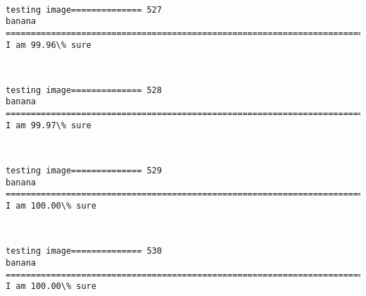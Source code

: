 \documentclass[11pt]{article}
\begin{document}
    \begin{center}
    \end{center}
    { \hspace*{\fill} \\}
    
    \begin{Verbatim}[commandchars=\\\{\}]
testing image============== 527
banana
============================================================================
I am 99.96\% sure

    \end{Verbatim}

    \begin{center}
    \end{center}
    { \hspace*{\fill} \\}
    
    \begin{Verbatim}[commandchars=\\\{\}]
testing image============== 528
banana
============================================================================
I am 99.97\% sure

    \end{Verbatim}

    \begin{center}
    \end{center}
    { \hspace*{\fill} \\}
    
    \begin{Verbatim}[commandchars=\\\{\}]
testing image============== 529
banana
============================================================================
I am 100.00\% sure

    \end{Verbatim}

    \begin{center}
    \end{center}
    { \hspace*{\fill} \\}
    
    \begin{Verbatim}[commandchars=\\\{\}]
testing image============== 530
banana
============================================================================
I am 100.00\% sure

    \end{Verbatim}
\end{document}
